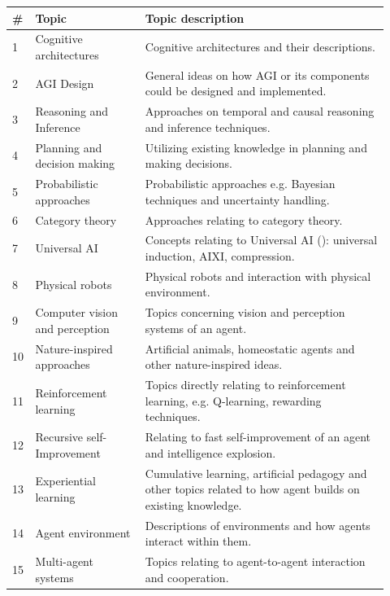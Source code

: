 \documentclass[utf8,english]{gradu3}
\begin{document}
\begin{table}[H]
  \footnotesize
  \centering
  \begin{tabular}{p{0.02\linewidth} p{0.28\linewidth} p{0.62\linewidth}}

    \textbf{\#} & \textbf{Topic}  & \textbf{Topic description}  \\ \hline
    1  & Cognitive architectures & Cognitive architectures and their descriptions.  \\ \hline
    2  & AGI Design & General ideas on how AGI or its components could be designed and implemented. \\ \hline
    3	 & Reasoning and Inference &  Approaches on temporal and causal reasoning and inference techniques. \\ \hline
    4	 & Planning and decision making & Utilizing existing knowledge in planning and making decisions. \\ \hline
    5	 & Probabilistic approaches & Probabilistic approaches e.g. Bayesian techniques and uncertainty handling.\\ \hline
    6	 & Category theory & Approaches relating to category theory.\\ \hline
    7	 & Universal AI & Concepts relating to Universal AI (\cite{hutter2004}): universal induction, AIXI, compression.\\ \hline
    8	 & Physical robots & Physical robots and interaction with physical environment. \\ \hline
    9	 & Computer vision and perception & Topics concerning vision and perception systems of an agent.\\ \hline
    10 & Nature-inspired approaches & Artificial animals, homeostatic agents and other nature-inspired ideas.\\ \hline
    11 & Reinforcement learning & Topics directly relating to reinforcement learning, e.g. Q-learning, rewarding techniques.\\ \hline
    12 & Recursive self-Improvement & Relating to fast self-improvement of an agent and intelligence explosion. \\ \hline
    13 & Experiential learning & Cumulative learning, artificial pedagogy and other topics related to how agent builds on existing knowledge.\\ \hline
    14 & Agent environment & Descriptions of environments and how agents interact within them.\\ \hline
    15 & Multi-agent systems & Topics relating to agent-to-agent interaction and cooperation.\\ \hline

\end{tabular}
\end{table}
\end{document}
